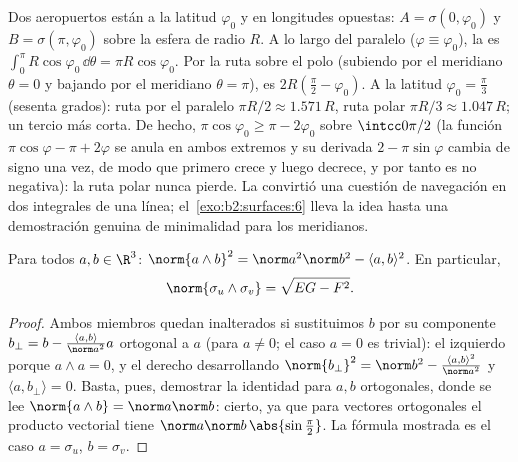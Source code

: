 \begin{example}\label{ex:b2:surfaces:polarroute}
Dos aeropuertos están a la latitud $\varphi_0$ y en longitudes
opuestas: $A = \sigma(0, \varphi_0)$ y $B = \sigma(\pi, \varphi_0)$
sobre la esfera de radio $R$. A lo largo del paralelo ($\varphi
\equiv \varphi_0$), la  es $\int_0^\pi
R\cos\varphi_0\,\dd\theta = \pi R\cos\varphi_0$. Por la ruta sobre el
polo (subiendo por el meridiano $\theta = 0$ y bajando por el
meridiano $\theta = \pi$), es $2R(\frac\pi2 - \varphi_0)$. A la
latitud $\varphi_0 = \frac\pi3$ (sesenta grados): ruta por el
paralelo $\pi R/2 \approx 1.571\,R$, ruta polar $\pi R/3 \approx
1.047\,R$; un tercio más corta. De hecho, $\pi\cos\varphi_0 \geq \pi
- 2\varphi_0$ sobre $\intcc0{\pi/2}$ (la función $\pi\cos\varphi -
\pi + 2\varphi$ se anula en ambos extremos y su derivada $2 -
\pi\sin\varphi$ cambia de signo una vez, de modo que primero crece y
luego decrece, y por tanto es no negativa): la ruta polar nunca
pierde. La  convirtió una cuestión de
navegación en dos integrales de una línea; el~\cref{exo:b2:surfaces:6} lleva la idea hasta una demostración
genuina de minimalidad para los meridianos.
\end{example}

\begin{lemma}\label{lem:b2:surfaces:lagrange}
Para todos $a, b \in \R^3$: $\norm{a \wedge b}^2 = \norm a^2 \norm
b^2 - \langle a, b\rangle^2$. En particular,
\[
\norm{\sigma_u \wedge \sigma_v} = \sqrt{EG - F^2}.
\]
\end{lemma}

\begin{proof}
Ambos miembros quedan inalterados si sustituimos $b$ por su
componente $b_\perp = b - \frac{\langle a, b\rangle}{\norm a^2}a$
ortogonal a $a$ (para $a \neq 0$; el caso $a = 0$ es trivial): el
izquierdo porque $a \wedge a = 0$, y el derecho desarrollando
$\norm{b_\perp}^2 = \norm b^2 - \frac{\langle a,b\rangle^2}{\norm
a^2}$ y $\langle a, b_\perp\rangle = 0$. Basta, pues, demostrar la
identidad para $a, b$ ortogonales, donde se lee $\norm{a \wedge b} =
\norm a \norm b$: cierto, ya que para vectores ortogonales el
producto vectorial tiene  $\norm a\norm
b\,\abs{\sin\frac\pi2}$. La fórmula mostrada es el caso $a =
\sigma_u$, $b = \sigma_v$.
\end{proof}

